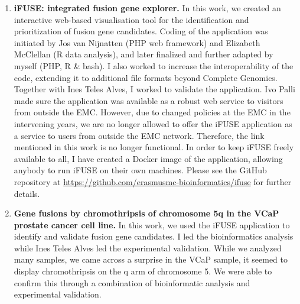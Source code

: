 \begin{enumerate}[label=\ref{chapter:fusiongenes}.\arabic*]
\itemsep-0.5em
\setcounter{enumi}{-1}
\item \textbf{iFUSE: integrated fusion gene explorer.}
In this work, we created an interactive web-based visualisation tool for the identification and prioritization of fusion gene candidates. Coding of the application was initiated by Jos van Nijnatten (PHP web framework) and Elizabeth McClellan (R data analysis), and later finalized and further adapted by myself (PHP, R \& bash). I also worked to increase the interoperability of the code, extending it to additional file formats beyond Complete Genomics. Together with Ines Teles Alves, I worked to validate the application. Ivo Palli made sure the application was available as a robust web service to visitors from outside the EMC. However, due to changed policies at the EMC in the intervening years, we are no longer allowed to offer the iFUSE application as a service to users from outside the EMC network. Therefore, the link mentioned in this work is no longer functional. In order to keep iFUSE freely available to all, I have created a Docker image of the application, allowing anybody to run iFUSE on their own machines. Please see the GitHub repository at \url{https://github.com/erasmusmc-bioinformatics/ifuse} for further details.

\item \textbf{Gene fusions by chromothripsis of chromosome 5q in the VCaP prostate cancer cell line.}
In this work, we used the iFUSE application to identify and validate fusion gene candidates. I led the bioinformatics analysis while Ines Teles Alves led the experimental validation. While we analyzed many samples, we came across a surprise in the VCaP sample, it seemed to display chromothripsis on the q arm of chromosome 5. We were able to confirm this through a combination of bioinformatic analysis and experimental validation.


\end{enumerate}


